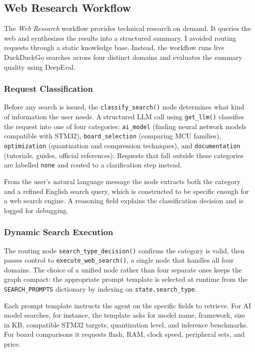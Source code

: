 \subsection{Web Research Workflow}
\label{sec:web_research}

The \textit{Web Research} workflow provides technical research on demand. It queries the web and synthesizes the results into a structured summary. I avoided routing requests through a static knowledge base. Instead, the workflow runs live DuckDuckGo searches across four distinct domains and evaluates the summary quality using DeepEval.

\subsubsection{Request Classification}

Before any search is issued, the \texttt{classify\_search()} node determines what kind of information the user needs. A structured LLM call using \texttt{get\_llm()} classifies the request into one of four categories: \texttt{ai\_model} (finding neural network models compatible with STM32), \texttt{board\_selection} (comparing MCU families), \texttt{optimization} (quantization and compression techniques), and \texttt{documentation} (tutorials, guides, official references). Requests that fall outside these categories are labelled \texttt{none} and routed to a clarification step instead.

From the user's natural language message the node extracts both the category and a refined English search query, which is constructed to be specific enough for a web search engine. A reasoning field explains the classification decision and is logged for debugging.

\subsubsection{Dynamic Search Execution}

The routing node \texttt{search\_\allowbreak type\_\allowbreak decision()} confirms the category is valid, then passes control to \texttt{execute\_\allowbreak web\_\allowbreak search()}, a single node that handles all four domains. The choice of a unified node rather than four separate ones keeps the graph compact: the appropriate prompt template is selected at runtime from the \texttt{SEARCH\_PROMPTS} dictionary by indexing on \texttt{state.search\_type}.

Each prompt template instructs the agent on the specific fields to retrieve. For AI model searches, for instance, the template asks for model name, framework, size in KB, compatible STM32 targets, quantization level, and inference benchmarks. For board comparisons it requests flash, RAM, clock speed, peripheral sets, and price.

